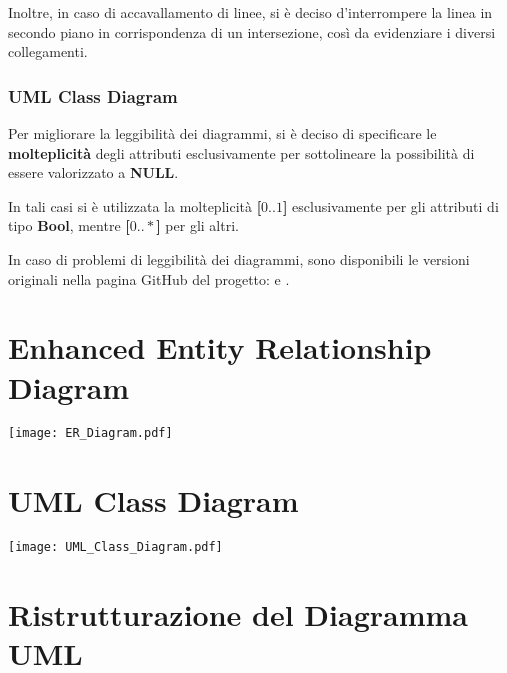 Inoltre, in caso di accavallamento di linee, si è deciso d'interrompere la linea in secondo piano in corrispondenza di un intersezione, così da evidenziare i diversi collegamenti.

\subsubsection{UML Class Diagram}

Per migliorare la leggibilità dei diagrammi, si è deciso di specificare le \textbf{molteplicità} degli attributi esclusivamente per sottolineare la possibilità di essere valorizzato a \textbf{NULL}. 

In tali casi si è utilizzata la molteplicità \textbf{[\(0..1\)]} esclusivamente per gli attributi di tipo \textbf{Bool}, mentre \textbf{[\(0..*\)]} per gli altri.

\bigskip

\begin{note}
  In caso di problemi di leggibilità dei diagrammi, sono disponibili le versioni originali nella pagina GitHub del progetto:
   e .
\end{note}

\newpage

\section{Enhanced Entity Relationship Diagram}
\begin{center}
  \texttt{[image: ER\_Diagram.pdf]}
\end{center}

\section{UML Class Diagram}
\begin{center}
  \texttt{[image: UML\_Class\_Diagram.pdf]}
\end{center}

\newpage

\section{Ristrutturazione del Diagramma UML}

